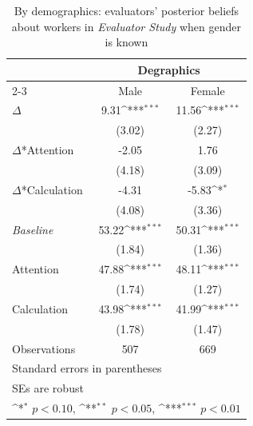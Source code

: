 \begin{table}[htbp]\centering
\def\sym#1{\ifmmode^{#1}\else\(^{#1}\)\fi}
\caption{By demographics: evaluators' posterior beliefs about workers in \textit{Evaluator Study} when gender is known}
\begin{tabular}{l*{2}{c}}
\hline\hline
                &\multicolumn{2}{c}{Degraphics}       \\\cmidrule(lr){2-3}
                &\multicolumn{1}{c}{Male}&\multicolumn{1}{c}{Female}\\
\hline
$\Delta$        &     9.31\sym{***}&    11.56\sym{***}\\
                &   (3.02)         &   (2.27)         \\
$\Delta$*Attention&    -2.05         &     1.76         \\
                &   (4.18)         &   (3.09)         \\
$\Delta$*Calculation&    -4.31         &    -5.83\sym{*}  \\
                &   (4.08)         &   (3.36)         \\
\textit{Baseline}&    53.22\sym{***}&    50.31\sym{***}\\
                &   (1.84)         &   (1.36)         \\
Attention       &    47.88\sym{***}&    48.11\sym{***}\\
                &   (1.74)         &   (1.27)         \\
Calculation     &    43.98\sym{***}&    41.99\sym{***}\\
                &   (1.78)         &   (1.47)         \\
\hline
Observations    &      507         &      669         \\
\hline\hline
\multicolumn{3}{l}{\footnotesize Standard errors in parentheses}\\
\multicolumn{3}{l}{\footnotesize SEs are robust}\\
\multicolumn{3}{l}{\footnotesize \sym{*} \(p<0.10\), \sym{**} \(p<0.05\), \sym{***} \(p<0.01\)}\\
\end{tabular}
\end{table}
